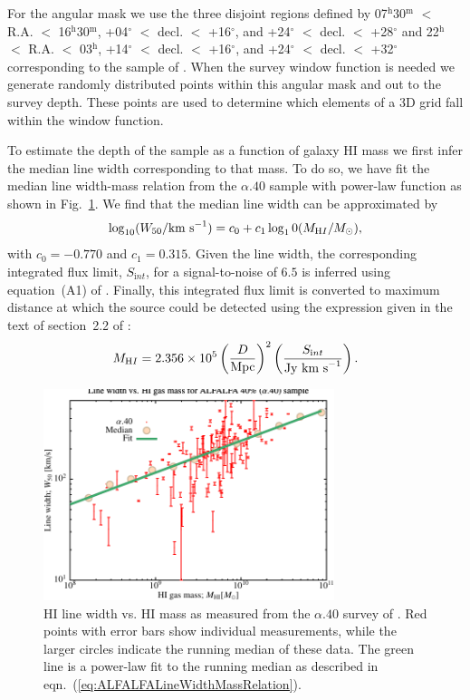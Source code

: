For the angular mask we use the three disjoint regions defined by 07$^{\mathrm h}$30$^{\mathrm m}$ $<$ R.A. $<$ 16$^{\mathrm h}$30$^{\mathrm m}$, +04$^\circ$ $<$ decl. $<$ +16$^\circ$, and +24$^\circ$ $<$ decl. $<$ +28$^\circ$ and 22$^{\mathrm h}$ $<$ R.A. $<$ 03$^{\mathrm h}$, +14$^\circ$ $<$ decl. $<$ +16$^\circ$, and +24$^\circ$ $<$ decl. $<$ +32$^\circ$ corresponding to the sample of \cite{martin_arecibo_2010}. When the survey window function is needed we generate randomly distributed points within this angular mask and out to the survey depth. These points are used to determine which elements of a 3D grid fall within the window function.

To estimate the depth of the \cite{martin_arecibo_2010} sample as a function of galaxy HI mass we first infer the median line width corresponding to that mass. To do so, we have fit the median line width-mass relation from the $\alpha.40$ sample with power-law function as shown in Fig.~\ref{fig:ALFALFALineWidthMassRelation}. We find that the median line width can be approximated by
\begin{equation}
 \log_{10} (W_{\mathrm 50}/\hbox{km s}^{-1}) = c_0 + c_1 \log_10(M_{\mathrm HI}/M_\odot),
 \label{eq:ALFALFALineWidthMassRelation}
\end{equation}
with $c_0=-0.770$ and $c_1=0.315$. Given the line width, the corresponding integrated flux limit, $S_{\mathrm int}$, for a signal-to-noise of $6.5$ is inferred using equation~(A1) of \cite{haynes_arecibo_2011}. Finally, this integrated flux limit is converted to maximum distance at which the source could be detected using the expression given in the text of section~2.2 of \cite{martin_arecibo_2010}:
\begin{equation}
 M_{\mathrm HI} = 2.356\times10^5 \left({D\over \hbox{Mpc}}\right)^2 \left({S_{\mathrm int}\over\hbox{Jy km s}^{-1}}\right).
\end{equation}

\begin{figure}
 \includegraphics[width=85mm,trim=0mm 0mm 0mm 4mm,clip]{Plots/DataAnalysis/alfalfaHILineWidthMassRelation.pdf}
 \caption{HI line width vs. HI mass as measured from the $\alpha.40$ survey of \protect\cite{martin_arecibo_2010}. Red points with error bars show individual measurements, while the larger circles indicate the running median of these data. The green line is a power-law fit to the running median as described in eqn.~(\protect\ref{eq:ALFALFALineWidthMassRelation}).}
 \label{fig:ALFALFALineWidthMassRelation}
\end{figure}
